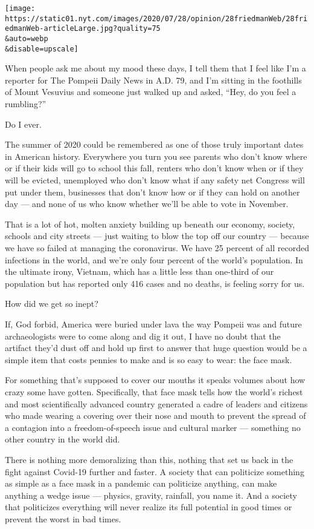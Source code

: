 \texttt{[image: https://static01.nyt.com/images/2020/07/28/opinion/28friedmanWeb/28friedmanWeb-articleLarge.jpg?quality=75\\\&auto=webp\\\&disable=upscale]}

When people ask me about my mood these days, I tell them that I feel
like I'm a reporter for The Pompeii Daily News in A.D. 79, and I'm
sitting in the foothills of Mount Vesuvius and someone just walked up
and asked, ``Hey, do you feel a rumbling?''

Do I ever.

The summer of 2020 could be remembered as one of those truly important
dates in American history. Everywhere you turn you see parents who don't
know where or if their kids will go to school this fall, renters who
don't know when or if they will be evicted, unemployed who don't know
what if any safety net Congress will put under them, businesses that
don't know how or if they can hold on another day --- and none of us who
know whether we'll be able to vote in November.

That is a lot of hot, molten anxiety building up beneath our economy,
society, schools and city streets --- just waiting to blow the top off
our country --- because we have so failed at managing the coronavirus.
We have 25 percent of all recorded infections in the world, and we're
only four percent of the world's population. In the ultimate irony,
Vietnam, which has a little less than one-third of our population but
has reported only 416 cases and no deaths, is feeling sorry for us.

How did we get so inept?

If, God forbid, America were buried under lava the way Pompeii was and
future archaeologists were to come along and dig it out, I have no doubt
that the artifact they'd dust off and hold up first to answer that huge
question would be a simple item that costs pennies to make and is so
easy to wear: the face mask.

For something that's supposed to cover our mouths it speaks volumes
about how crazy some have gotten. Specifically, that face mask tells how
the world's richest and most scientifically advanced country generated a
cadre of leaders and citizens who made wearing a covering over their
nose and mouth to prevent the spread of a contagion into a
freedom-of-speech issue and cultural marker --- something no other
country in the world did.

There is nothing more demoralizing than this, nothing that set us back
in the fight against Covid-19 further and faster. A society that can
politicize something as simple as a face mask in a pandemic can
politicize anything, can make anything a wedge issue --- physics,
gravity, rainfall, you name it. And a society that politicizes
everything will never realize its full potential in good times or
prevent the worst in bad times.

